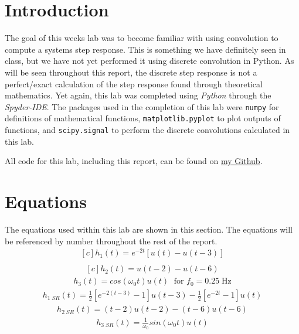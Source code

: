\documentclass[12pt]{report}
\begin{document}
\section{Introduction}
The goal of this weeks lab was to become familiar with using convolution to compute a systems step response. This is something we have definitely seen in class,
but we have not yet performed it using discrete convolution in Python. As will be seen throughout this report, the discrete step response is not a perfect/exact calculation
of the step response found through theoretical mathematics. Yet again, this lab was completed using \textit{Python} through the \textit{Spyder-IDE}. 
The packages used in the completion of this lab were \texttt{numpy} for definitions of mathematical functions, \texttt{matplotlib.pyplot} to plot outputs of functions,
and \texttt{scipy.signal} to perform the discrete convolutions calculated in this lab.

All code for this lab, including this report, can be found on \href{http://github.com/mac-edmondson}{my Github}.
\section{Equations}\label{section: eq}
The equations used within this lab are shown in this section. The equations will be referenced by number throughout the rest of the report.
\begin{equation}\label{eq: 1}
  \begin{aligned}[c]
    h_1(t) = e^{-2t}[u(t) - u(t-3)]\\
  \end{aligned}
\end{equation}
\begin{equation}\label{eq: 2}
  \begin{aligned}[c]
    h_2(t) = u(t-2) - u(t-6)
  \end{aligned}
\end{equation}
\begin{equation}\label{eq: 3}
  \begin{aligned}
    h_3(t) = cos(\omega_0 t)u(t) \;\textrm{ for } f_0 = 0.25\; \textrm{Hz}
  \end{aligned}
\end{equation}
\begin{equation}\label{eq: 4}
  \begin{aligned}
    h_{1\; SR}(t) = \frac{1}{2}[e^{-2(t-3)}-1]u(t-3)-\frac{1}{2}[e^{-2t}-1]u(t)
  \end{aligned}
\end{equation}
\begin{equation}\label{eq: 5}
  \begin{aligned}
    h_{2\; SR}(t) = (t-2)u(t-2) - (t-6)u(t-6)
  \end{aligned}
\end{equation}
\begin{equation}\label{eq: 6}
  \begin{aligned}
    h_{3\; SR}(t) = \frac{1}{\omega_0}sin(\omega_0t)u(t)
  \end{aligned}
\end{equation}
\end{document}
